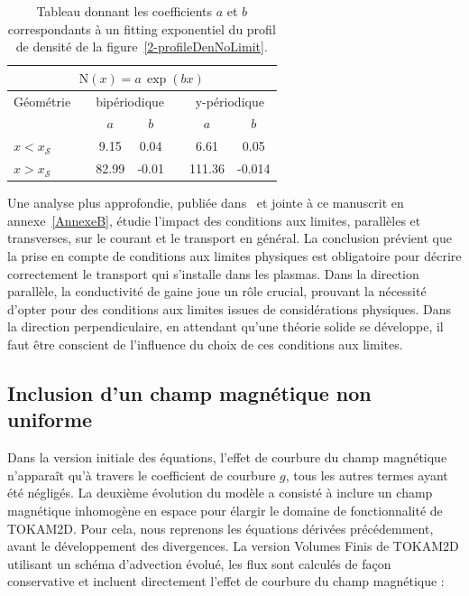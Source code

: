 \begin{refsection}
	\begin{table}[!htbp]
\footnotesize\centering
{}
\begin{tabular}{@{}lcccccc@{}}\toprule
\multicolumn{7}{c}{$\text{N}(x)=a\,\exp(bx)$}\\
\midrule 
Géométrie&&\multicolumn{2}{c}{bipériodique}&&\multicolumn{2}{c}{y-périodique}\\
\midrule 
&&$a$&$b$&&$a$&$b$\\
$x<x_\mathcal{S}$&&\footnotesize{9.15}&\footnotesize{0.04}&&\footnotesize{6.61}&\footnotesize{0.05}\\
$x>x_\mathcal{S}$&&\footnotesize{82.99}&\footnotesize{-0.01}&&\footnotesize{111.36}&\footnotesize{-0.014}\\
\bottomrule
\end{tabular}
\caption{Tableau donnant les coefficients $a$ et $b$
correspondants à un fitting exponentiel du profil de densité
de la figure~\ref{2-profileDenNoLimit}.}\label{2-expFit}
\end{table}
	
	Une analyse plus approfondie, publiée dans~\parencite{Futtersack} et
	jointe à ce manuscrit en annexe~\ref{AnnexeB}, étudie l'impact des conditions
	aux limites, parallèles et transverses, sur le courant et le transport en général.
	La conclusion prévient que la prise en compte de conditions aux limites
	physiques est obligatoire pour décrire correctement le transport qui
	s'installe dans les plasmas. Dans la direction parallèle, la conductivité de
	gaine joue un rôle crucial, prouvant la nécessité d'opter pour des conditions
	aux limites issues de considérations physiques. Dans la direction
	perpendiculaire, en attendant qu'une théorie solide se développe, il faut être
	conscient de l'influence du choix de ces conditions aux limites.
	
	\subsection{Inclusion d'un champ magnétique non uniforme}
	
	Dans la version initiale
	des équations, l'effet de courbure du champ magnétique n'apparaît qu'à travers
	le coefficient de courbure $g$, tous les autres termes ayant été négligés.
	La deuxième évolution du modèle a consisté à inclure un champ magnétique
	inhomogène en espace pour élargir le domaine de fonctionnalité de TOKAM2D. Pour
	cela, nous reprenons les équations dérivées précédemment, avant le développement
	des divergences. La version Volumes Finis de TOKAM2D utilisant un schéma
	d'advection évolué, les flux sont calculés de façon conservative et incluent
	directement l'effet de courbure du champ magnétique :
	

\end{refsection}
